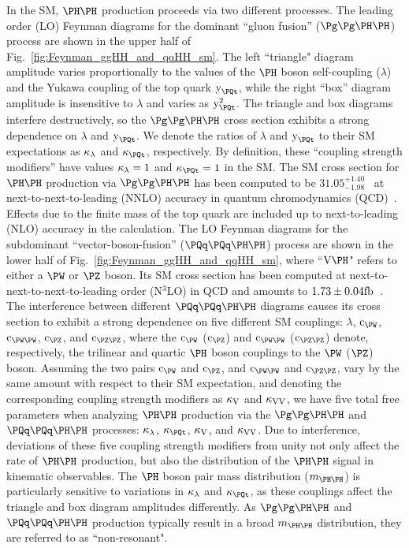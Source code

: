 In the SM, $\HH$ production proceeds via two different processes.
The leading order (LO) Feynman diagrams for the dominant ``gluon fusion'' ($\ggHH$) process are shown in the upper half of Fig.~\ref{fig:Feynman_ggHH_and_qqHH_sm}.
The left ``triangle" diagram amplitude varies proportionally to the values of the $\PHiggs$ boson self-coupling ($\lambda$)
and the Yukawa coupling of the top quark $\yt$,
while the right ``box'' diagram amplitude is insensitive to $\lambda$ and varies as $\yt^{2}$.
The triangle and box diagrams interfere destructively, 
so the $\ggHH$ cross section exhibits a strong dependence on $\lambda$ and $\yt$.
We denote the ratios of $\lambda$ and $\yt$ to their SM expectations as $\kappa_{\lambda}$ and $\kappat$, respectively.
By definition, these ``coupling strength modifiers'' have values $\kappa_{\lambda} = 1$ and $\kappat = 1$ in the SM.
The SM cross section for $\HH$ production via $\ggHH$ has been computed to be $31.05^{+1.40}_{-1.98}$~\fb
at next-to-next-to-leading (NNLO) accuracy in quantum chromodynamics (QCD)~\cite{Grazzini:2018hh}.
Effects due to the finite mass of the top quark are included up to next-to-leading (NLO) accuracy in the calculation.
The LO Feynman diagrams for the subdominant ``vector-boson-fusion'' ($\qqHH$) process are shown in the lower half of Fig.~\ref{fig:Feynman_ggHH_and_qqHH_sm},
where ``$\VH$" refers to either a $\PW$ or $\PZ$ boson.
Its SM cross section has been computed at next-to-next-to-next-to-leading order (N$^{3}$LO) in QCD
and amounts to $1.73 \pm 0.04\text{fb}$~\cite{Dreyer:2018qbw}.
The interference between different $\qqHH$ diagrams causes its cross section to exhibit a strong dependence on five different SM couplings:
$\lambda$, $\cW$, $\cWW$, $\cZ$, and $\cZZ$,
where the $\cW$ ($\cZ$) and $\cWW$ ($\cZZ$) denote, respectively, the trilinear and quartic $\PHiggs$ boson couplings to the $\PW$ ($\PZ$) boson.
Assuming the two pairs $\cW$ and $\cZ$, and $\cWW$ and $\cZZ$, vary by the same amount with respect to their SM expectation, 
and denoting the corresponding coupling strength modifiers as $\kappa_{\textrm{V}}$ and $\kappa_{\textrm{V}\textrm{V}}$, we have five total free parameters
when analyzing $\HH$ production via the $\ggHH$ and $\qqHH$ processes: $\kappa_{\lambda}$, $\kappat$, $\kappa_{\textrm{V}}$, and $\kappa_{\textrm{V}\textrm{V}}$. %
Due to interference, deviations of these five coupling strength modifiers from unity not only affect the rate of $\HH$ production,
but also the distribution of the $\HH$ signal in kinematic observables.
The $\PHiggs$ boson pair mass distribution ($\mHH$) is particularly sensitive to variations in $\kappa_{\lambda}$ and $\kappat$,
as these couplings affect the triangle and box diagram amplitudes differently.
As $\ggHH$ and $\qqHH$ production typically result in a broad $\mHH$ distribution,
they are referred to as ``non-resonant".

